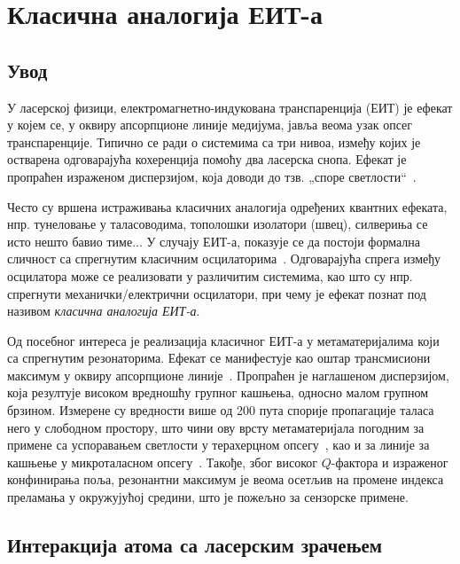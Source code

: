 \documentclass[main.tex]{subfiles}
\begin{document}
\chapter{Класична аналогија ЕИТ-а}%
\label{cha:klasik_eit}

\section{Увод}%
\label{sec:uvod}

У ласерској физици, електромагнетно-индукована транспаренција (ЕИТ) је ефекат у којем се, у оквиру апсорпционе линије медијума, јавља веома узак опсег транспаренције. Типично се ради о системима са три нивоа, између којих је остварена одговарајућа кохеренција помоћу два ласерска снопа. Ефекат је пропраћен израженом дисперзијом, која доводи до тзв. „споре светлости``~\cite{harris1990nonlinear}.

Често су вршена истраживања класичних аналогија одређених квантних ефеката, нпр. тунеловање у таласоводима, тополошки изолатори (швец), силвериња се исто нешто бавио тиме... %
У случају ЕИТ-а, показује се да постоји формална сличност са спрегнутим класичним осцилаторима~\cite{garrido2002classical}. Одговарајућа спрега између осцилатора може се реализовати у различитим системима, као што су нпр. спрегнути механички/електрични осцилатори, при чему је ефекат познат под називом \emph{класична аналогија ЕИТ-а}.%

Од посебног интереса је реализација класичног ЕИТ-а у метаматеријалима који са спрегнутим резонаторима. Ефекат се манифестује као оштар трансмисиони максимум у оквиру апсорпционе линије~\cite{tassin:09,cihan,mr05}. Пропраћен је наглашеном дисперзијом, која резултује високом вредношћу групног кашњења, односно малом групном брзином. Измерене су вредности више од 200 пута спорије пропагације таласа него у слободном простору, што чини ову врсту метаматеријала погодним за примене са успоравањем светлости у терахерцном опсегу~\cite{tassin:09}, као и за линије за кашњење у микроталасном опсегу~\cite{mr05}. Такође, због високог $Q$-фактора и израженог конфинирања поља, резонантни максимум је веома осетљив на промене индекса преламања у окружујућој средини, што је пожељно за сензорске примене.

\section{Интеракција атома са ласерским зрачењем}
\end{document}
